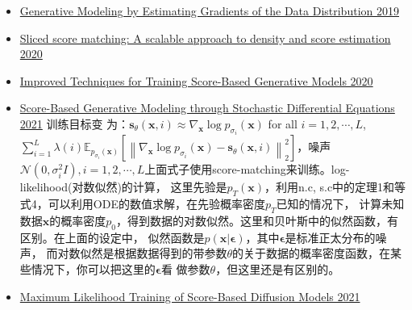 \begin{itemize}
  \item \href{c}{Generative Modeling by Estimating Gradients of the Data Distribution 2019}
  \item \href{c.c}{Sliced score matching: A scalable approach to density and score estimation 2020}
  \item \href{c}{Improved Techniques for Training Score-Based Generative Models 2020}
  \item \href{c}{Score-Based Generative Modeling through Stochastic Differential Equations 2021} 训练目标变
  为：$\mathbf{s}_\theta(\mathbf{x}, i) \approx \nabla_{\mathbf{x}} \log p_{\sigma_i}(\mathbf{x})$ 
  for all $i=1,2, \cdots, L$, $\sum_{i=1}^L \lambda(i) \mathbb{E}_{p_{\sigma_i}(\mathbf{x})}
  \left[\left\|\nabla_{\mathbf{x}} \log p_{\sigma_i}(\mathbf{x})-\mathbf{s}_\theta(\mathbf{x}, i)
  \right\|_2^2\right]$，噪声$\mathcal{N}\left(0, \sigma_i^2 I\right), i=1,2, \cdots, L
  $上面式子使用score-matching来训练。log-likelihood(对数似然)的计算，
  这里先验是$p_T(\mathbf{x})$，利用n.c, s.c中的定理1和等式4，可以利用ODE的数值求解，在先验概率密度$p_T$已知的情况下，
  计算未知数据$\mathbf{x}$的概率密度$p_0$，得到数据的对数似然。这里和贝叶斯中的似然函数，有区别。在上面的设定中，
  似然函数是$p(\mathbf{x}|\mathbf{\epsilon})$，其中$\mathbf{\epsilon}$是标准正太分布的噪声，
  而对数似然是根据数据得到的带参数$\theta$的关于数据的概率密度函数，在某些情况下，你可以把这里的$\mathbf{\epsilon}$看
  做参数$\theta$，但这里还是有区别的。
  \item \href{c.c}{Maximum Likelihood Training of Score-Based Diffusion Models 2021}
  

\end{itemize}
